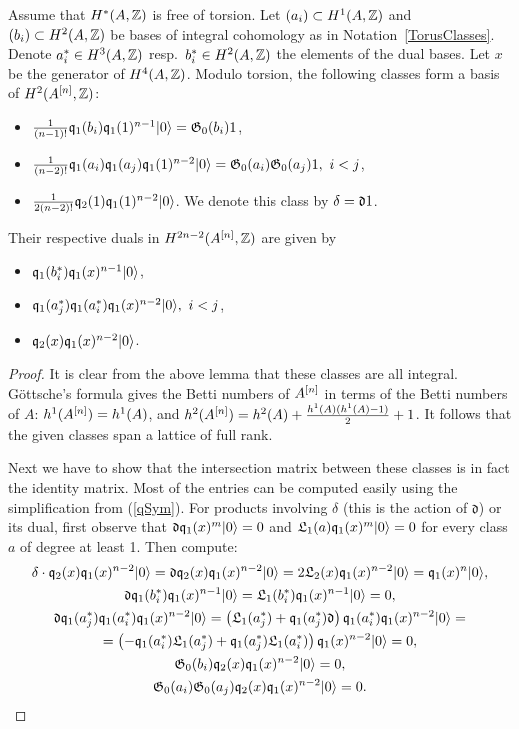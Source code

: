 \begin{proposition} Assume that $H^*(A,\mathbb{Z})$ is free of torsion.
Let $(a_i) \subset H^1(A,\mathbb{Z})$ and $(b_i)\subset H^2(A,\mathbb{Z})$ be bases of integral cohomology as in Notation~\ref{TorusClasses}. Denote $a_i^*\in H^3(A,\mathbb{Z})$ resp.~$b_i^*\in H^2(A,\mathbb{Z})$ the elements of the dual bases. Let $x$ be the generator of $H^4(A,\mathbb{Z})$. Modulo torsion, the following classes form a basis of $H^2(A^{[n]},\mathbb{Z})$:
\begin{itemize}
 \item $\frac{1}{(n-1)!}\mathfrak{q}_{1}(b_{i})\mathfrak{q}_{1}(1)^{n-1}|0\rangle = \mathfrak{G}_0(b_i) 1$,
 \item $ \frac{1}{(n-2)!}\mathfrak{q}_{1}(a_{i})\mathfrak{q}_{1}(a_{j})\mathfrak{q}_{1}(1)^{n-2}|0\rangle = \mathfrak{G}_0(a_i) \mathfrak{G}_0(a_j)1,\  i < j$, 
 \item $ \frac{1}{2(n-2)!}\mathfrak{q}_{2}(1) \mathfrak{q}_{1}(1)^{n-2}|0\rangle$. We denote this class by $\delta = \mathfrak{d} 1$.
\end{itemize}
Their respective duals in $H^{2n-2}(A^{[n]},\mathbb{Z})$ are given by
\begin{itemize}
 \item $\mathfrak{q}_{1}(b_{i}^*)\mathfrak{q}_{1}(x)^{n-1}|0\rangle$,
 \item $\mathfrak{q}_{1}(a_{j}^*)\mathfrak{q}_{1}(a_{i}^*)\mathfrak{q}_{1}(x)^{n-2}|0\rangle,\  i < j$,
 \item $\mathfrak{q}_2(x)\mathfrak{q}_{1}(x)^{n-2} |0\rangle$.
\end{itemize}
\end{proposition}
\begin{proof} It is clear from the above lemma that these classes are all integral.
G\"ottsche's formula \cite[p.~35]{Gottsche} gives the Betti numbers of $A^{[n]}$ in terms of the Betti numbers of $A$: 
$h^1(A^{[n]}) = h^1(A)$, and $h^2(A^{[n]}) = h^2(A)+ \frac{h^1(A)(h^1(A)-1)}{2} + 1$. It follows that the given classes span a lattice of full rank.

Next we have to show that the intersection matrix between these classes is in fact the identity matrix. Most of the entries can be computed easily using the simplification from (\ref{qSym}). For products involving $\delta$ (this is the action of $\mathfrak{d}$) or its dual, first observe that $\mathfrak{d}\mathfrak{q}_1(x)^m|0\rangle = 0 $ and $ \mathfrak{L}_1(a)\mathfrak{q}_1(x)^m|0\rangle =0$ for every class $a$ of degree at least 1. Then compute:
\begin{gather*}
\delta \cdot\mathfrak{q}_2(x)\mathfrak{q}_{1}(x)^{n-2} |0\rangle = \mathfrak{d}\mathfrak{q}_2(x)\mathfrak{q}_{1}(x)^{n-2} |0\rangle = 2 \mathfrak{L}_2(x) \mathfrak{q}_{1}(x)^{n-2} |0\rangle = \mathfrak{q}_{1}(x)^{n}|0\rangle,
\\
\mathfrak{d}\mathfrak{q}_{1}(b_{i}^*)\mathfrak{q}_{1}(x)^{n-1}|0\rangle =  \mathfrak{L}_1(b_i^*) \mathfrak{q}_{1}(x)^{n-1} |0\rangle = 0,
\\
\mathfrak{d}\mathfrak{q}_{1}(a_{j}^*)\mathfrak{q}_{1}(a_{i}^*)\mathfrak{q}_{1}(x)^{n-2}|0\rangle = \left(\mathfrak{L}_1(a_j^*) +\mathfrak{q}_{1}(a_{j}^*)\mathfrak{d}\right)\mathfrak{q}_{1}(a_{i}^*)\mathfrak{q}_{1}(x)^{n-2}|0\rangle = 
  \\ =\left(-\mathfrak{q}_1(a_i^*)\mathfrak{L}_1(a_j^*) + \mathfrak{q}_{1}(a_{j}^*)\mathfrak{L}_1(a_i^*)\right)\mathfrak{q}_{1}(x)^{n-2}|0\rangle  = 0,
\\
\mathfrak{G}_0(b_i)\mathfrak{q}_2(x)\mathfrak{q}_{1}(x)^{n-2} |0\rangle = 0, 
\\
\mathfrak{G}_0(a_i)\mathfrak{G}_0(a_j)\mathfrak{q}_2(x)\mathfrak{q}_{1}(x)^{n-2} |0\rangle = 0.
\qedhere
\end{gather*}
\end{proof}

